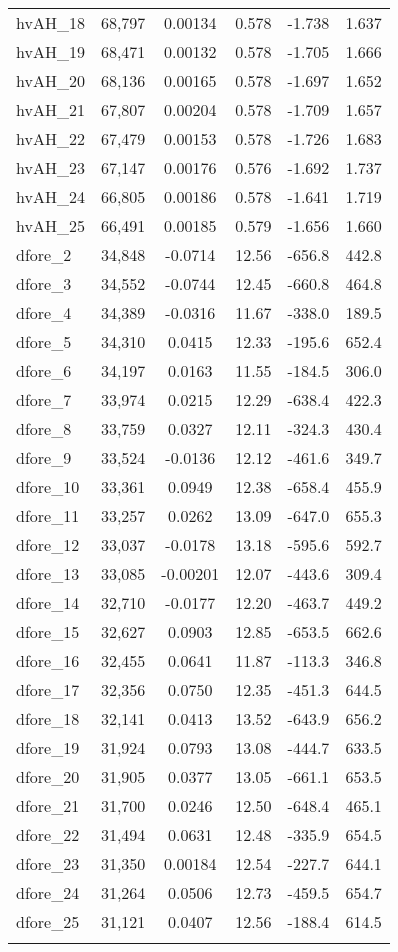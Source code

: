 \begin{tabular}{lccccc}
hvAH\_18 & 68,797 & 0.00134 & 0.578 & -1.738 & 1.637 \\
hvAH\_19 & 68,471 & 0.00132 & 0.578 & -1.705 & 1.666 \\
hvAH\_20 & 68,136 & 0.00165 & 0.578 & -1.697 & 1.652 \\
hvAH\_21 & 67,807 & 0.00204 & 0.578 & -1.709 & 1.657 \\
hvAH\_22 & 67,479 & 0.00153 & 0.578 & -1.726 & 1.683 \\
hvAH\_23 & 67,147 & 0.00176 & 0.576 & -1.692 & 1.737 \\
hvAH\_24 & 66,805 & 0.00186 & 0.578 & -1.641 & 1.719 \\
hvAH\_25 & 66,491 & 0.00185 & 0.579 & -1.656 & 1.660 \\
dfore\_2 & 34,848 & -0.0714 & 12.56 & -656.8 & 442.8 \\
dfore\_3 & 34,552 & -0.0744 & 12.45 & -660.8 & 464.8 \\
dfore\_4 & 34,389 & -0.0316 & 11.67 & -338.0 & 189.5 \\
dfore\_5 & 34,310 & 0.0415 & 12.33 & -195.6 & 652.4 \\
dfore\_6 & 34,197 & 0.0163 & 11.55 & -184.5 & 306.0 \\
dfore\_7 & 33,974 & 0.0215 & 12.29 & -638.4 & 422.3 \\
dfore\_8 & 33,759 & 0.0327 & 12.11 & -324.3 & 430.4 \\
dfore\_9 & 33,524 & -0.0136 & 12.12 & -461.6 & 349.7 \\
dfore\_10 & 33,361 & 0.0949 & 12.38 & -658.4 & 455.9 \\
dfore\_11 & 33,257 & 0.0262 & 13.09 & -647.0 & 655.3 \\
dfore\_12 & 33,037 & -0.0178 & 13.18 & -595.6 & 592.7 \\
dfore\_13 & 33,085 & -0.00201 & 12.07 & -443.6 & 309.4 \\
dfore\_14 & 32,710 & -0.0177 & 12.20 & -463.7 & 449.2 \\
dfore\_15 & 32,627 & 0.0903 & 12.85 & -653.5 & 662.6 \\
dfore\_16 & 32,455 & 0.0641 & 11.87 & -113.3 & 346.8 \\
dfore\_17 & 32,356 & 0.0750 & 12.35 & -451.3 & 644.5 \\
dfore\_18 & 32,141 & 0.0413 & 13.52 & -643.9 & 656.2 \\
dfore\_19 & 31,924 & 0.0793 & 13.08 & -444.7 & 633.5 \\
dfore\_20 & 31,905 & 0.0377 & 13.05 & -661.1 & 653.5 \\
dfore\_21 & 31,700 & 0.0246 & 12.50 & -648.4 & 465.1 \\
dfore\_22 & 31,494 & 0.0631 & 12.48 & -335.9 & 654.5 \\
dfore\_23 & 31,350 & 0.00184 & 12.54 & -227.7 & 644.1 \\
dfore\_24 & 31,264 & 0.0506 & 12.73 & -459.5 & 654.7 \\
dfore\_25 & 31,121 & 0.0407 & 12.56 & -188.4 & 614.5 \\
 &  &  &  &  &  \\ \hline
\end{tabular}
